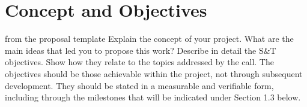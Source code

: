 \section{Concept and Objectives}\label{sec:objectives}
\begin{todo}{from the proposal template}
  Explain the concept of your project. What are the main ideas that led you to propose
  this work?  Describe in detail the S\&T objectives. Show how they relate to the topics
  addressed by the call. The objectives should be those achievable within the project, not
  through subsequent development. They should be stated in a measurable and verifiable
  form, including through the milestones that will be indicated under Section 1.3 below.
\end{todo}

